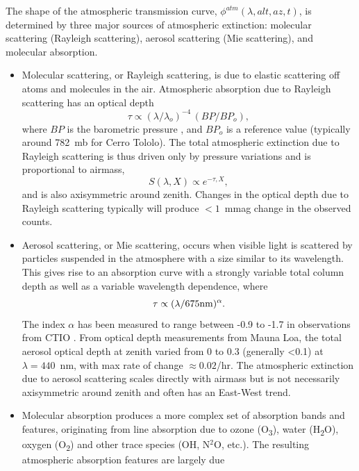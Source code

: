 \documentclass[12pt,preprint]{aastex}
\newcommand{\water}   {H\textsubscript{2}O}
\newcommand{\ozone}    {O\textsubscript{3}}
\newcommand{\oxy}     {O\textsubscript{2}}
\begin{document}
\label{sec:atmo_behavior}
The shape of the atmospheric transmission curve, $\phi^{atm}(\lambda,
alt, az, t)$, is determined by three major sources of atmospheric
extinction: molecular scattering (Rayleigh scattering), aerosol
scattering (Mie scattering), and molecular absorption. 
\begin{itemize}
\item{Molecular scattering, or Rayleigh scattering, is due to elastic
scattering off atoms and molecules in the air. Atmospheric absorption
due to Rayleigh scattering has an optical depth 
\begin{equation}
\tau \propto (\lambda/ \lambda_o)^{-4}\, (BP/BP_o),
\end{equation} 
where $BP$ is the barometric pressure \citep{Hansen1974}, and $BP_o$ is a reference value
(typically around 782~mb for Cerro Tololo).  The total atmospheric
extinction due to Rayleigh scattering is thus driven only by pressure
variations and is proportional to airmass, 
\begin{equation}
S(\lambda,X) \propto e^{-\tau, X},
\end{equation} 
and is also axisymmetric around zenith. Changes in the
optical depth due to Rayleigh scattering typically will produce
$<1$~mmag change in the observed counts.}
\item{Aerosol scattering, or Mie scattering, occurs when visible light
is scattered by particles suspended in the atmosphere with a size
similar to its wavelength.  This gives rise to an absorption curve
with a strongly variable total column depth as well as a variable wavelength
dependence, where 
\begin{equation}
\tau \propto (\lambda/675 \rm{nm})^{\alpha}.
\end{equation} 
The index $\alpha$ has been measured to range between -0.9 to -1.7 in
observations from CTIO \citep{Burke2010b}.  From \citep{Stubbs2007b}
optical depth measurements from Mauna Loa, the total aerosol optical
depth at zenith varied from 0 to 0.3 (generally <0.1) at
$\lambda=440$~nm, with max rate of change $\approx0.02$/hr. The
atmospheric extinction due to aerosol scattering scales directly with airmass but is not
necessarily axisymmetric around zenith and often has an East-West
trend.}
\item{Molecular absorption produces a more complex
set of absorption bands and features, originating from line absorption
due to ozone (\ozone), water (\water), oxygen (\oxy) and other trace species
(OH, N$^2$O, etc.). The resulting atmospheric absorption features are largely due
}
\end{itemize}
\end{document}
